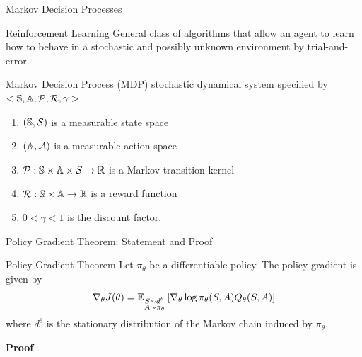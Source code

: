 \begin{frame}{Markov Decision Processes}
	\begin{block}{Reinforcement Learning}
		General class of algorithms that allow an agent to learn how to behave
		in a stochastic and possibly unknown environment by trial-and-error.
	\end{block}
	
	\begin{block}{Markov Decision Process (MDP)}
		stochastic dynamical system specified by $<\S, \A, \calP, \calR, \gamma>$
		\begin{enumerate}
			\item $(\S, \calS)$ is a measurable state space
			\item $(\A, \calA)$ is a measurable action space
			\item $\calP: \S \times \A \times \calS \to \R$ is a Markov transition kernel
			\item $\calR: \S \times \A \to \R$ is a reward function
			\item $0 < \gamma < 1$ is the discount factor.
		\end{enumerate}
	\end{block}
\end{frame}


\begin{frame}{Policy Gradient Theorem: Statement and Proof}

	\begin{block}{Policy Gradient Theorem}
	Let $\pi_\theta$ be a differentiable policy. The policy gradient is given by 
	\begin{equation*}
		\nabla_\theta J(\theta) =
		\E[\substack{S \sim d^\theta\\A \sim \pi_\theta}]{\nabla_\theta\log
		\pi_\theta(S,A) Q_{\theta}(S, A)}
	\end{equation*}
	where $d^\theta$ is the stationary distribution of the Markov chain induced by $\pi_\theta$. 
	\end{block}
	\textbf{Proof}\\
\end{frame}

